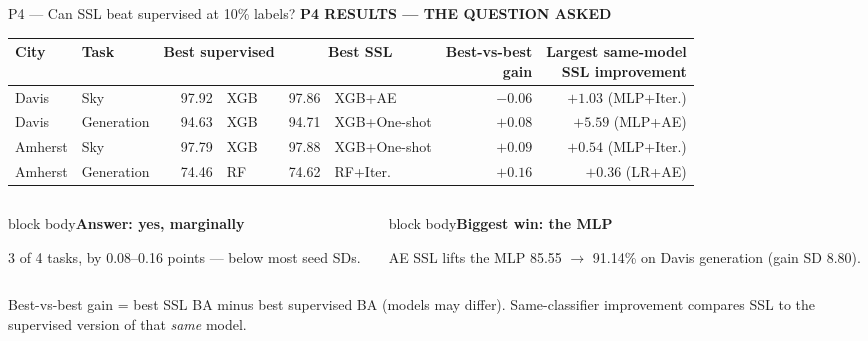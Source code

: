 \documentclass[aspectratio=169,11pt]{beamer}
\newcommand{\sectiontag}[1]{{\footnotesize\usebeamercolor[fg]{structure}\textbf{#1}}\par\vspace{0.10cm}}
\newcommand{\smallmuted}[1]{{\footnotesize\color{slate}#1\par}}
\newcommand{\factbox}[2]{\begin{beamercolorbox}[sep=0.13cm,wd=\linewidth]{block body}{\bfseries #1}\par\small #2\end{beamercolorbox}}
\begin{document}
\begin{frame}{P4 — Can SSL beat supervised at 10\% labels?}
\sectiontag{P4 \quad RESULTS — THE QUESTION ASKED}
{\fontsize{8.4}{9.9}\selectfont
\setlength{\tabcolsep}{3.0pt}
\renewcommand{\arraystretch}{1.35}
\begin{tabular}{@{}llrlrlrr@{}}\toprule
\textbf{City} & \textbf{Task} & \multicolumn{2}{c}{\textbf{Best supervised}} & \multicolumn{2}{c}{\textbf{Best SSL}} & \shortstack{\textbf{Best-vs-best}\\\textbf{gain}} & \shortstack{\textbf{Largest same-model}\\\textbf{SSL improvement}}\\\midrule
Davis & Sky & 97.92 & XGB & 97.86 & XGB+AE & \textcolor{warn}{$-0.06$} & $+1.03$ (MLP+Iter.)\\
Davis & Generation & 94.63 & XGB & 94.71 & XGB+One-shot & $+0.08$ & \cellcolor{softteal}$\mathbf{+5.59}$ (MLP+AE)\\
Amherst & Sky & 97.79 & XGB & 97.88 & XGB+One-shot & $+0.09$ & $+0.54$ (MLP+Iter.)\\
Amherst & Generation & 74.46 & RF & 74.62 & RF+Iter. & $+0.16$ & $+0.36$ (LR+AE)\\
\bottomrule\end{tabular}}
\vspace{0.10cm}
\begin{columns}[T,totalwidth=\textwidth]
\begin{column}{0.48\textwidth}
\factbox{Answer: yes, marginally}{3 of 4 tasks, by 0.08--0.16 points --- below most seed SDs.}
\end{column}
\begin{column}{0.48\textwidth}
\factbox{Biggest win: the MLP}{AE SSL lifts the MLP 85.55 $\to$ 91.14\% on Davis generation (gain SD 8.80).}
\end{column}
\end{columns}
\smallmuted{Best-vs-best gain = best SSL BA minus best supervised BA (models may differ). Same-classifier improvement compares SSL to the supervised version of that \emph{same} model.}\par\vspace{0.08cm}
\end{frame}
\end{document}

